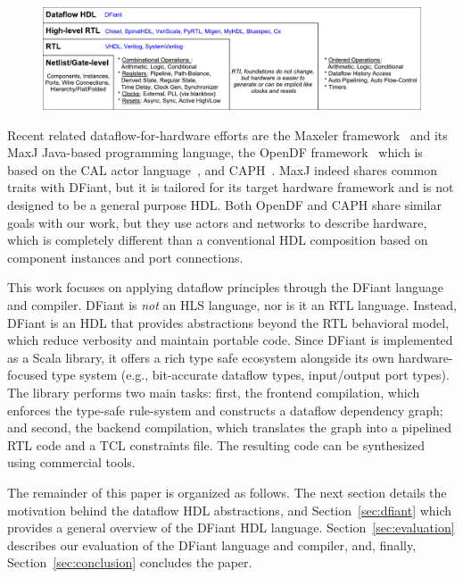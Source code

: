 \begin{figure}[t]
	\centering
	\captionsetup{justification=centering}
	\includegraphics[width=\linewidth]{graphics/motivation.pdf} 
	\label{fig:motivation}
\end{figure}

Recent related dataflow-for-hardware efforts are the Maxeler framework~\cite{Pell2011} and its MaxJ Java-based programming language, the OpenDF framework~\cite{bhattacharyya2008opendf} which is based on the CAL actor language~\cite{eker2003cal}, and CAPH~\cite{serot2011implementing}. MaxJ indeed shares common traits with DFiant, but it is tailored for its target hardware framework and is not designed to be a general purpose HDL. Both OpenDF and CAPH share similar goals with our work, but they use actors and networks to describe hardware, which is completely different than a conventional HDL composition based on component instances and port connections.

This work focuses on applying dataflow principles through the DFiant language and compiler. DFiant is \emph{not} an HLS language, nor is it an RTL language. Instead, DFiant is an HDL that provides abstractions beyond the RTL behavioral model, which reduce verbosity and maintain portable code. Since DFiant is implemented as a Scala library, it offers a rich type safe ecosystem alongside its own hardware-focused type system (e.g., bit-accurate dataflow types, input/output port types). The library performs two main tasks: first, the frontend compilation, which enforces the type-safe rule-system and constructs a dataflow dependency graph; and second, the backend compilation, which translates the graph into a pipelined RTL code and a TCL constraints file. The resulting code can be synthesized using commercial tools. 

The remainder of this paper is organized as follows. The next section details the motivation behind the dataflow HDL abstractions, and Section~\ref{sec:dfiant} which provides a general overview of the DFiant HDL language. 
Section~\ref{sec:evaluation} describes our evaluation of the DFiant language and compiler, and, finally, Section~\ref{sec:conclusion} concludes the paper.


 